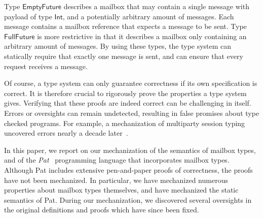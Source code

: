 Type $\mathsf{EmptyFuture}$ describes a mailbox that may contain
a single  message with payload of type $\mathsf{Int}$, and a
potentially arbitrary amount of  messages.
Each  message contains a mailbox reference that
expects a  message to be sent.
%
Type $\mathsf{FullFuture}$ is more restrictive in that it describes a mailbox
only containing an arbitrary amount of  messages.
By using these types, the type system can statically require that exactly one
 message is sent, and can ensure that every  request receives
a  message.

Of course, a type system can only guarantee correctness if its own specification is correct.
It is therefore crucial to rigorously prove the properties a type system gives.
Verifying that these proofs are indeed correct can be challenging in itself.
Errors or oversights can remain undetected, resulting in false promises about
type checked programs. For example, a mechanization of multiparty session typing
\cite{hondaMultipartyAsynchronousSession2016} uncovered errors nearly a decade
later~\cite{tiroreMultipartyAsynchronousSession2025}.

In this paper, we report on our mechanization of the semantics of mailbox types,
and of the
\emph{Pat}~\cite{fowlerSpecialDeliveryProgramming2023} programming language that
incorporates mailbox types. 
Although Pat includes extensive pen-and-paper proofs of correctness, the proofs
have not been mechanized.
In particular, we have mechanized numerous properties about mailbox types
themselves, and have mechanized the static semantics of Pat.  During our
mechanization, we discovered several oversights in the original definitions and
proofs which have since been fixed.

